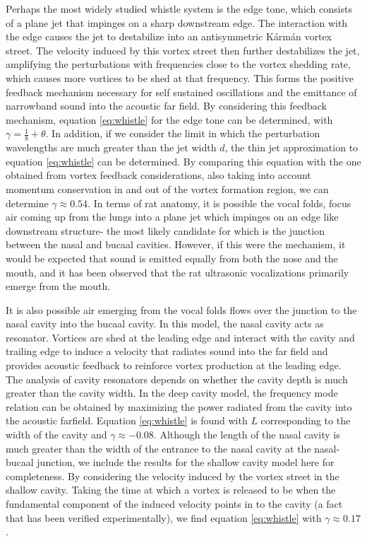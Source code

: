 Perhaps the most widely studied whistle system is the edge tone, which consists of a plane jet that impinges on a sharp downstream edge. The interaction with the edge causes the jet to destabilize into an antisymmetric K\'{a}rm\'{a}n vortex street. The velocity induced by this vortex street then further destabilizes the jet, amplifying the perturbations with frequencies close to the vortex shedding rate, which causes more vortices to be shed at that frequency. This forms the positive feedback mechanism necessary for self sustained oscillations and the emittance of narrowband sound into the acoustic far field. By considering this feedback mechanism, equation \ref{eq:whistle} for the edge tone can be determined, with $\gamma=\frac{1}{8}+\theta$. In addition, if we consider the limit in which the perturbation wavelengths are much greater than the jet width $d$, the thin jet approximation to equation \ref{eq:whistle} can be determined. By comparing this equation with the one obtained from vortex feedback considerations, also taking into account momentum conservation in and out of the vortex formation region, we can determine $\gamma\approx0.54$. In terms of rat anatomy, it is possible the vocal folds, focus air coming up from the lungs into a plane jet which impinges on an edge like downstream structure- the most likely candidate for which is the junction between the nasal and bucaal cavities. However, if this were the mechanism, it would be expected that sound is emitted equally from both the nose and the mouth, and it has been observed that the rat ultrasonic vocalizations primarily emerge from the mouth. 

It is also possible air emerging from the vocal folds flows over the junction to the nasal cavity into the bucaal cavity. In this model, the nasal cavity acts as resonator. Vortices are shed at the leading edge and interact with the cavity and trailing edge to induce a velocity that radiates sound into the far field and provides acoustic feedback to reinforce vortex production at the leading edge. The analysis of cavity resonators depends on whether the cavity depth is much greater than the cavity width. In the deep cavity model, the frequency mode relation can be obtained by maximizing the power radiated from the cavity into the acoustic farfield. Equation \ref{eq:whistle} is found with $L$ corresponding to the width of the cavity and $\gamma\approx-0.08$. Although the length of the nasal cavity is much greater than the width of the entrance to the nasal cavity at the nasal-bucaal junction, we include the results for the shallow cavity model here for completeness. By considering the velocity induced by the vortex street in the shallow cavity. Taking the time at which a vortex is released to be when the fundamental component of the induced velocity points in to the cavity (a fact that has been verified experimentally), we find equation \ref{eq:whistle} with $\gamma\approx0.17$.      

